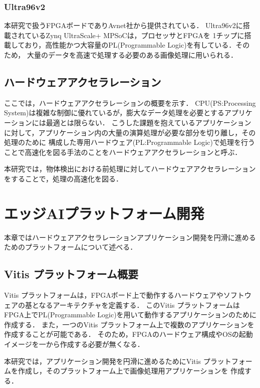 \documentclass[11pt,a4j]{jreport}
\begin{document}
\subsection{Ultra96v2}
本研究で扱うFPGAボードでありAvnet社から提供されている．
Ultra96v2に搭載されているZynq UltraScale+ MPSoC\cite{boardinfo}は，プロセッサとFPGAを
1チップに搭載しており，高性能かつ大容量のPL(Programmable Logic)を有している．そのため，
大量のデータを高速で処理する必要のある画像処理に用いられる．

\section{ハードウェアアクセラレーション}
ここでは，ハードウェアアクセラレーション\cite{HWAccel}の概要を示す．
CPU(PS:Processing System)は複雑な制御に優れているが，膨大なデータ処理を必要とするアプリケーションには最適とは限らない．
こうした課題を抱えているアプリケーションに対して，アプリケーション内の大量の演算処理が必要な部分を切り離し，その処理のために
構成した専用ハードウェア(PL:Programmable Logic)で処理を行うことで高速化を図る手法のことをハードウェアアクセラレーションと呼ぶ．

本研究では，物体検出における前処理に対してハードウェアアクセラレーションをすることで，処理の高速化を図る．
%
\chapter{エッジAIプラットフォーム開発}
本章ではハードウェアアクセラレーションアプリケーション開発を円滑に進めるためのプラットフォームについて述べる．
\section{Vitis プラットフォーム概要}
Vitis プラットフォーム\cite{VitisPlatform}は，FPGAボード上で動作するハードウェアやソフトウェアの基となるアーキテクチャを定義する．
このVitis プラットフォームはFPGA上でPL(Programmable Logic)を用いて動作するアプリケーションのために作成する．
また，一つのVitis プラットフォーム上で複数のアプリケーションを作成することが可能である．
そのため，FPGAのハードウェア構成やOSの起動イメージを一から作成する必要が無くなる．

本研究では，アプリケーション開発を円滑に進めるためにVitis プラットフォームを作成し，そのプラットフォーム上で画像処理用アプリケーションを
作成する．
\end{document}
